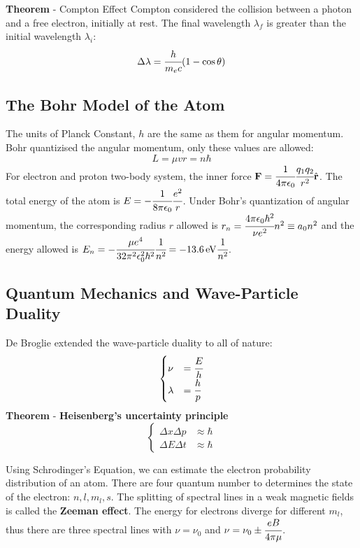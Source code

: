 \documentclass{article}
\numberwithin{equation}{section}
\numberwithin{figure}{section}
\begin{document}
	{\bf Theorem} - {Compton Effect}
	Compton considered the collision between a photon and a free electron, initially at rest. The final wavelength $\lambda_f$ is greater than the initial wavelength $\lambda_i$:
	\begin{equation}
		\Delta \lambda = \cfrac{h}{m_ec}(1-\cos\theta)
	\end{equation}
	
	\subsection{The Bohr Model of the Atom}
	The units of Planck Constant, $h$ are the same as them for angular momentum. Bohr quantizised the angular momentum, only these values are allowed:
	\begin{equation}
		L = \mu vr = n\hbar
	\end{equation}
	For electron and proton two-body system, the inner force ${\bf F} = \cfrac{1}{4\pi\epsilon_0}\cfrac{q_1q_2}{r^2}\hat{\bf r}$. The total energy of the atom is $E = -\cfrac{1}{8\pi\epsilon_0}\cfrac{e^2}{r}$. Under Bohr's quantization of angular momentum, the corresponding radius $r$ allowed is $r_n = \cfrac{4\pi\epsilon_0\hbar^2}{\nu e^2}n^2 \equiv a_0n^2$ and the energy allowed is $E_n = -\cfrac{\mu e^4}{32\pi^2\epsilon_0^2\hbar^2}\cfrac{1}{n^2} = -13.6\,{\rm eV}\cfrac{1}{n^2}$.
	
	\subsection{Quantum Mechanics and Wave-Particle Duality}
	De Broglie extended the wave-particle duality to all of nature:
	\begin{equation}
		\begin{cases}
			\nu &= \cfrac{E}{h} \\
			\lambda &= \cfrac{h}{p}
 		\end{cases}
	\end{equation}
	{\bf Theorem} - {\bf Heisenberg's uncertainty principle}
	\begin{equation}
		\begin{cases}
		\Delta x\Delta p &\approx \hbar \\
		\Delta E\Delta t &\approx \hbar
		\end{cases}
	\end{equation}
	
	Using Schrodinger's Equation, we can estimate the electron probability distribution of an atom. There are four quantum number to determines the state of the electron: $n,l,m_l,s$. The splitting of spectral lines in a weak magnetic fields is called the {\bf Zeeman effect}. The energy for electrons diverge for different $m_l$, thus there are three spectral lines with $\nu = \nu_0$ and $\nu = \nu_0 \pm \cfrac{eB}{4\pi\mu}$.
	
\end{document}
